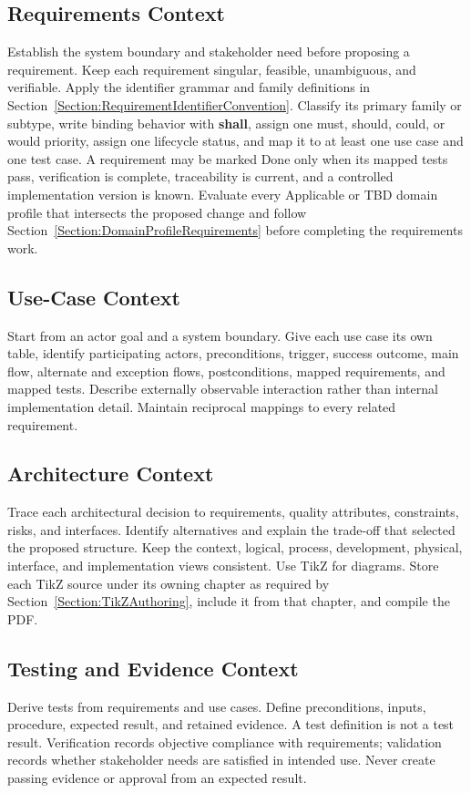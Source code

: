 \subsection{Requirements Context}
Establish the system boundary and stakeholder need before proposing a
requirement. Keep each requirement singular, feasible, unambiguous, and
verifiable. Apply the identifier grammar and family definitions in
Section~\ref{Section:RequirementIdentifierConvention}. Classify its primary
family or subtype, write binding behavior with
\textbf{shall}, assign one \gls{must}, \gls{should}, \gls{could}, or
\gls{would} priority, assign one lifecycle status, and map it to at least one
use case and one test case. A requirement may be marked Done only when its
mapped tests pass, verification is complete, traceability is current, and a
controlled implementation version is known. Evaluate every Applicable or TBD
domain profile that intersects the proposed change and follow
Section~\ref{Section:DomainProfileRequirements} before completing the
requirements work.

\subsection{Use-Case Context}
Start from an actor goal and a system boundary. Give each use case its own
table, identify participating actors, preconditions, trigger, success outcome,
main flow, alternate and exception flows, postconditions, mapped requirements,
and mapped tests. Describe externally observable interaction rather than
internal implementation detail. Maintain reciprocal mappings to every related
requirement.

\subsection{Architecture Context}
Trace each architectural decision to requirements, quality attributes,
constraints, risks, and interfaces. Identify alternatives and explain the
trade-off that selected the proposed structure. Keep the context, logical,
process, development, physical, interface, and implementation views consistent.
Use TikZ for diagrams.
Store each TikZ source under its owning chapter as required by
Section~\ref{Section:TikZAuthoring}, include it from that chapter, and compile
the PDF.

\subsection{Testing and Evidence Context}
Derive tests from requirements and use cases. Define preconditions, inputs,
procedure, expected result, and retained evidence. A test definition is not a
test result. Verification records objective compliance with requirements;
validation records whether stakeholder needs are satisfied in intended use.
Never create passing evidence or approval from an expected result.

